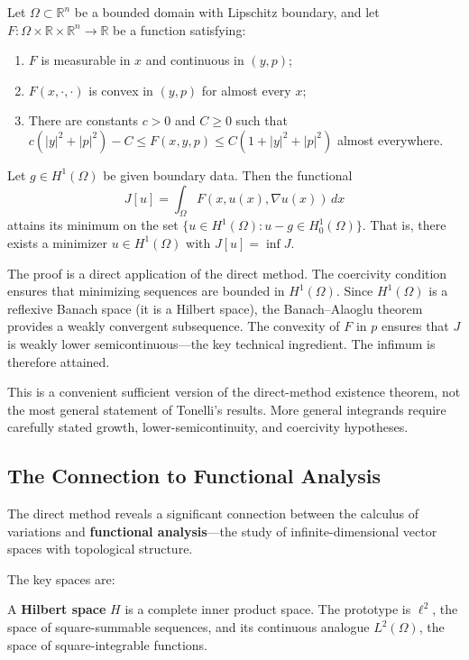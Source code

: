 \begin{theorem}
\label{thm:tonelli}
Let $\Omega \subset \mathbb{R}^n$ be a bounded domain with Lipschitz boundary, and let $F: \Omega \times \mathbb{R} \times \mathbb{R}^n \to \mathbb{R}$ be a function satisfying:
\begin{enumerate}
    \item $F$ is measurable in $x$ and continuous in $(y, p)$;
    \item $F(x,\cdot,\cdot)$ is convex in $(y,p)$ for almost every $x$;
    \item There are constants $c>0$ and $C\geq 0$ such that $c(|y|^2+|p|^2)-C \leq F(x,y,p) \leq C(1+|y|^2+|p|^2)$ almost everywhere.
\end{enumerate}
Let $g \in H^1(\Omega)$ be given boundary data. Then the functional
\[
    J[u] = \int_\Omega F(x, u(x), \nabla u(x)) \, dx
\]
attains its minimum on the set $\{u \in H^1(\Omega) : u - g \in H^1_0(\Omega)\}$. That is, there exists a minimizer $u \in H^1(\Omega)$ with $J[u] = \inf J$.
\end{theorem}

The proof is a direct application of the direct method. The coercivity condition ensures that minimizing sequences are bounded in $H^1(\Omega)$. Since $H^1(\Omega)$ is a reflexive Banach space (it is a Hilbert space), the Banach--Alaoglu theorem provides a weakly convergent subsequence. The convexity of $F$ in $p$ ensures that $J$ is weakly lower semicontinuous---the key technical ingredient. The infimum is therefore attained.

This is a convenient sufficient version of the direct-method existence theorem, not the most general statement of Tonelli's results. More general integrands require carefully stated growth, lower-semicontinuity, and coercivity hypotheses.

\subsection{The Connection to Functional Analysis}

The direct method reveals a significant connection between the calculus of variations and \textbf{functional analysis}---the study of infinite-dimensional vector spaces with topological structure.

The key spaces are:

\begin{definition}
A \textbf{Hilbert space} $H$ is a complete inner product space. The prototype is $\ell^2$, the space of square-summable sequences, and its continuous analogue $L^2(\Omega)$, the space of square-integrable functions.
\end{definition}

